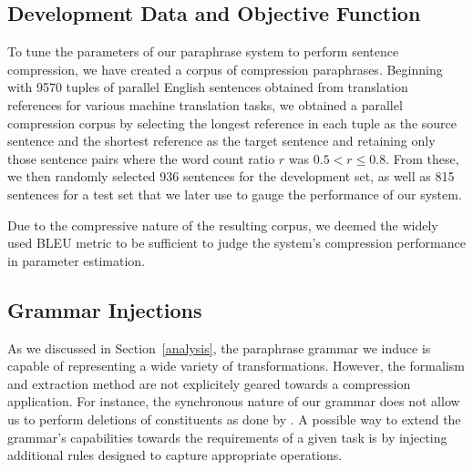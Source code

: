 \documentclass[11pt]{article}
\begin{document}
\subsection{Development Data and Objective Function}
To tune the parameters of our paraphrase system to perform sentence
compression, we have created a corpus of compression
paraphrases. Beginning with 9570 tuples of parallel English sentences
obtained from translation references for various machine translation
tasks, we obtained a parallel compression corpus by selecting the
longest reference in each tuple as the source sentence and the
shortest reference as the target sentence and retaining only those
sentence pairs where the word count ratio $r$ was $0.5 < r \leq
0.8$. From these, we then randomly selected 936 sentences for the
development set, as well as 815 sentences for a test set that we later
use to gauge the performance of our system.

Due to the compressive nature of the resulting corpus, we deemed the
widely used BLEU metric \cite{Papineni2002} to be sufficient to judge
the system's compression performance in parameter estimation.



\subsection{Grammar Injections} \label{injection}

As we discussed in Section~\ref{analysis}, the paraphrase grammar we
induce is capable of representing a wide variety of
transformations. However, the formalism and extraction method are not
explicitely geared towards a compression application. For instance,
the synchronous nature of our grammar does not allow us to perform
deletions of constituents as done by .  A possible
way to extend the grammar's capabilities towards the requirements of a
given task is by injecting additional rules designed to capture
appropriate operations. 
\end{document}
